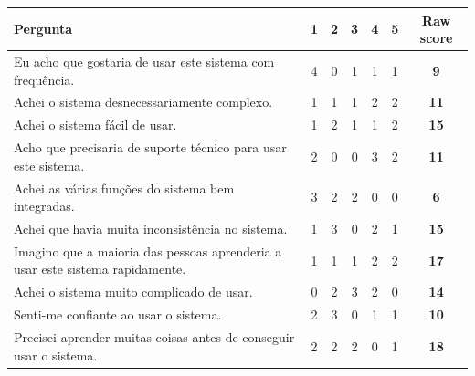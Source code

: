 \documentclass[a4paper,12pt]{article}
\begin{document}
\vspace{0.5cm}

\begin{table}[h!]
    \centering
    \begin{tabular}{|m{10cm}|c|c|c|c|c|c|}
        \hline
        \textbf{Pergunta}                                                             & \textbf{1} & \textbf{2} & \textbf{3} & \textbf{4} & \textbf{5} & \textbf{Raw score} \\ \hline
        Eu acho que gostaria de usar este sistema com frequência.                     & 4          & 0          & 1          & 1          & 1          & \textbf{9}         \\ \hline
        Achei o sistema desnecessariamente complexo.                                  & 1          & 1          & 1          & 2          & 2          & \textbf{11}        \\ \hline
        Achei o sistema fácil de usar.                                                & 1          & 2          & 1          & 1          & 2          & \textbf{15}        \\ \hline
        Acho que precisaria de suporte técnico para usar este sistema.                & 2          & 0          & 0          & 3          & 2          & \textbf{11}        \\ \hline
        Achei as várias funções do sistema bem integradas.                            & 3          & 2          & 2          & 0          & 0          & \textbf{6}         \\ \hline
        Achei que havia muita inconsistência no sistema.                              & 1          & 3          & 0          & 2          & 1          & \textbf{15}        \\ \hline
        Imagino que a maioria das pessoas aprenderia a usar este sistema rapidamente. & 1          & 1          & 1          & 2          & 2          & \textbf{17}        \\ \hline
        Achei o sistema muito complicado de usar.                                     & 0          & 2          & 3          & 2          & 0          & \textbf{14}        \\ \hline
        Senti-me confiante ao usar o sistema.                                         & 2          & 3          & 0          & 1          & 1          & \textbf{10}        \\ \hline
        Precisei aprender muitas coisas antes de conseguir usar o sistema.            & 2          & 2          & 2          & 0          & 1          & \textbf{18}        \\ \hline
    \end{tabular}
\end{table}
\vspace{0.5cm}
\end{document}

